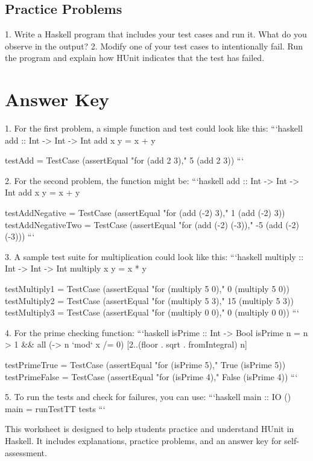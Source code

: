\documentclass{article}
\begin{document}
\subsection*{Practice Problems}
1. Write a Haskell program that includes your test cases and run it. What do you observe in the output?
2. Modify one of your test cases to intentionally fail. Run the program and explain how HUnit indicates that the test has failed.

\section*{Answer Key}
1. For the first problem, a simple function and test could look like this:
   ```haskell
   add :: Int -> Int -> Int
   add x y = x + y

   testAdd = TestCase (assertEqual "for (add 2 3)," 5 (add 2 3))
   ```

2. For the second problem, the function might be:
   ```haskell
   add :: Int -> Int -> Int
   add x y = x + y

   testAddNegative = TestCase (assertEqual "for (add (-2) 3)," 1 (add (-2) 3))
   testAddNegativeTwo = TestCase (assertEqual "for (add (-2) (-3))," -5 (add (-2) (-3)))
   ```

3. A sample test suite for multiplication could look like this:
   ```haskell
   multiply :: Int -> Int -> Int
   multiply x y = x * y

   testMultiply1 = TestCase (assertEqual "for (multiply 5 0)," 0 (multiply 5 0))
   testMultiply2 = TestCase (assertEqual "for (multiply 5 3)," 15 (multiply 5 3))
   testMultiply3 = TestCase (assertEqual "for (multiply 0 0)," 0 (multiply 0 0))
   ```

4. For the prime checking function:
   ```haskell
   isPrime :: Int -> Bool
   isPrime n = n > 1 && all (\x -> n `mod` x /= 0) [2..(floor . sqrt . fromIntegral) n]

   testPrimeTrue = TestCase (assertEqual "for (isPrime 5)," True (isPrime 5))
   testPrimeFalse = TestCase (assertEqual "for (isPrime 4)," False (isPrime 4))
   ```

5. To run the tests and check for failures, you can use:
   ```haskell
   main :: IO ()
   main = runTestTT tests
   ```

This worksheet is designed to help students practice and understand HUnit in Haskell. It includes explanations, practice problems, and an answer key for self-assessment.
\end{document}
